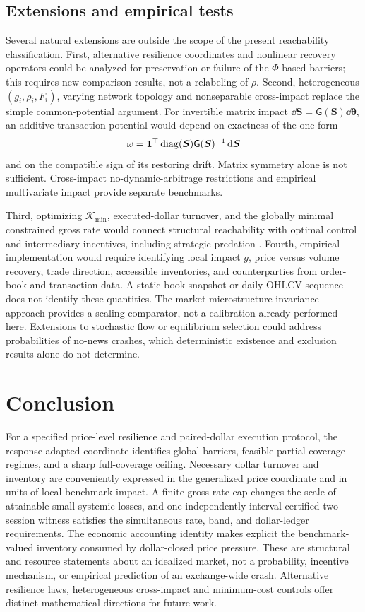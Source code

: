 \documentclass[review,hidelinks,onefignum,onetabnum]{siamonline250211}
\begin{document}
\subsection{Extensions and empirical tests}
Several natural extensions are outside the scope of the present reachability classification. First, alternative resilience coordinates and nonlinear recovery operators could be analyzed for preservation or failure of the $\Phi$-based barriers; this requires new comparison results, not a relabeling of $\rho$. Second, heterogeneous $(g_i,\rho_i,F_i)$, varying network topology and nonseparable cross-impact replace the simple common-potential argument. For invertible matrix impact $\dd\bm S=\mathsf G(\bm S)\dd\bm\theta$, an additive transaction potential would depend on exactness of the one-form
\[
\omega=\mathbf{1}^\top\operatorname{diag}(\bm S)\mathsf G(\bm S)^{-1}\,\mathrm{d}\bm S
\]
and on the compatible sign of its restoring drift. Matrix symmetry alone is not sufficient. Cross-impact no-dynamic-arbitrage restrictions \citep{AlfonsiKlockSchied2016,SchneiderLillo2019} and empirical multivariate impact \citep{BenzaquenEtAl2017} provide separate benchmarks.

Third, optimizing $\mathcal K_{\min}$, executed-dollar turnover, and the globally minimal constrained gross rate would connect structural reachability with optimal control and intermediary incentives, including strategic predation \citep{BrunnermeierPedersen2005}. Fourth, empirical implementation would require identifying local impact $g$, price versus volume recovery, trade direction, accessible inventories, and counterparties from order-book and transaction data. A static book snapshot or daily OHLCV sequence does not identify these quantities. The market-microstructure-invariance approach \citep{KyleObizhaeva2023} provides a scaling comparator, not a calibration already performed here. Extensions to stochastic flow or equilibrium selection could address probabilities of no-news crashes, which deterministic existence and exclusion results alone do not determine.

\section{Conclusion}\label{sec:conclusion}
For a specified price-level resilience and paired-dollar execution protocol, the response-adapted coordinate identifies global barriers, feasible partial-coverage regimes, and a sharp full-coverage ceiling. Necessary dollar turnover and inventory are conveniently expressed in the generalized price coordinate and in units of local benchmark impact. A finite gross-rate cap changes the scale of attainable small systemic losses, and one independently interval-certified two-session witness satisfies the simultaneous rate, band, and dollar-ledger requirements. The economic accounting identity makes explicit the benchmark-valued inventory consumed by dollar-closed price pressure. These are structural and resource statements about an idealized market, not a probability, incentive mechanism, or empirical prediction of an exchange-wide crash. Alternative resilience laws, heterogeneous cross-impact and minimum-cost controls offer distinct mathematical directions for future work.
\end{document}

